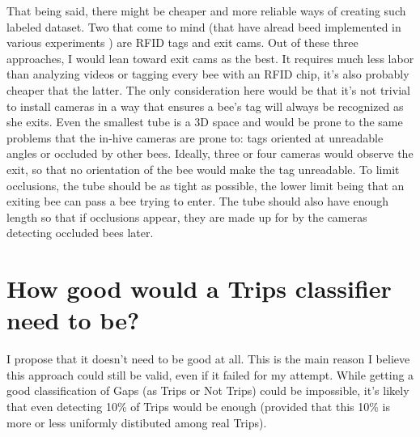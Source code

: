That being said, there might be cheaper and more reliable ways of creating such labeled dataset. Two that come to mind (that have alread beed implemented in various experiments ) are RFID tags and exit %
cams. Out of these three approaches, I would lean toward exit cams as the best. It requires much less labor than analyzing videos or tagging every bee with an RFID chip, it's also probably cheaper that the latter. The only consideration here would be that it's not trivial to install cameras in a way that ensures a bee's tag will always be recognized as she exits. Even the smallest tube is a 3D space and would be prone to the same problems that the in-hive cameras are prone to: tags oriented at unreadable angles or occluded by other bees. Ideally, three or four cameras would observe the exit, so that no orientation of the bee would make the tag unreadable. To limit occlusions, the tube should be as tight as possible, the lower limit being that an exiting bee can pass a bee trying to enter. The tube should also have enough length so that if occlusions appear, they are made up for by the cameras detecting occluded bees later.


\section{How good would a Trips classifier need to be?}

I propose that it doesn't need to be good at all. This is the main reason I believe this approach could still be valid, even if it failed for my attempt. While getting a good classification of Gaps (as Trips or Not Trips) could be impossible, it's likely that even detecting 10\% of Trips would be enough (provided that this 10\% is more or less uniformly distibuted among real Trips).
